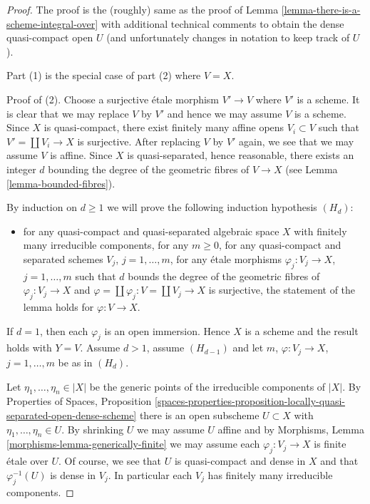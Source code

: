 \documentclass[10pt,a4paper]{amsart}
\theoremstyle{plain}
\theoremstyle{definition}
\theoremstyle{remark}
\numberwithin{equation}{subsection}
\begin{document}
\begin{proof}
The proof is the (roughly) same as the proof of
Lemma \ref{lemma-there-is-a-scheme-integral-over}
with additional technical comments to obtain
the dense quasi-compact open $U$ (and unfortunately
changes in notation to keep track of $U$).

\medskip\noindent
Part (1) is the special case of part (2) where $V = X$.

\medskip\noindent
Proof of (2). Choose a surjective \'etale morphism $V' \to V$
where $V'$ is a scheme. It is clear that we may replace $V$ by $V'$
and hence we may assume $V$ is a scheme. Since $X$ is quasi-compact,
there exist finitely many affine opens $V_i \subset V$ such that
$V' = \coprod V_i \to X$ is surjective.
After replacing $V$ by $V'$ again, we see that we may assume $V$ is affine.
Since $X$ is quasi-separated, hence reasonable, there exists an integer
$d$ bounding the degree of the geometric fibres of $V \to X$
(see Lemma \ref{lemma-bounded-fibres}).

\medskip\noindent
By induction on $d \geq 1$ we will prove the following induction
hypothesis $(H_d)$:
\begin{itemize}
\item for any quasi-compact and quasi-separated algebraic space
$X$ with finitely many irreducible components, for any $m \geq 0$,
for any quasi-compact and separated schemes $V_j$, $j = 1, \ldots, m$,
for any \'etale morphisms $\varphi_j : V_j \to X$, $j = 1, \ldots, m$
such that $d$ bounds the degree of the geometric fibres of
$\varphi_j : V_j\to X$ and
$\varphi = \coprod \varphi_j : V = \coprod V_j \to X$
is surjective, the statement of the lemma holds for $\varphi : V \to X$.
\end{itemize}
If $d = 1$, then each $\varphi_j$ is an open immersion. Hence $X$
is a scheme and the result holds with $Y = V$.
Assume $d > 1$, assume $(H_{d - 1})$ and let
$m$, $\varphi : V_j \to X$, $j = 1, \ldots, m$ be as in $(H_d)$.

\medskip\noindent
Let $\eta_1, \ldots, \eta_n \in |X|$ be the generic points of the
irreducible components of $|X|$. By
Properties of Spaces, Proposition
\ref{spaces-properties-proposition-locally-quasi-separated-open-dense-scheme}
there is an open subscheme $U \subset X$ with $\eta_1, \ldots, \eta_n \in U$.
By shrinking $U$ we may assume $U$ affine and by
Morphisms, Lemma \ref{morphisms-lemma-generically-finite}
we may assume each $\varphi_j : V_j \to X$ is finite \'etale over $U$.
Of course, we see that $U$ is quasi-compact and dense in $X$
and that $\varphi_j^{-1}(U)$ is dense in $V_j$. In particular each $V_j$
has finitely many irreducible components.


\end{proof}
\end{document}
